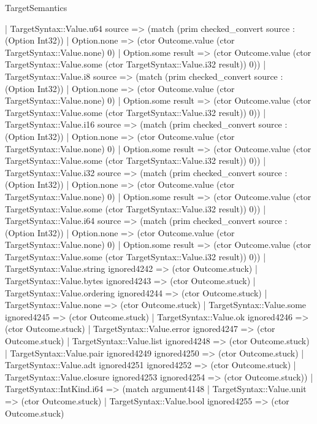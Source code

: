 \begin{lexlean}{TargetSemantics}
\begin{semanticmodule}
{            | TargetSyntax::Value.u64 source => (match (prim checked_convert source : (Option Int32))
              | Option.none => (ctor Outcome.value (ctor TargetSyntax::Value.none) 0)
              | Option.some result => (ctor Outcome.value (ctor TargetSyntax::Value.some (ctor TargetSyntax::Value.i32 result)) 0))
            | TargetSyntax::Value.i8 source => (match (prim checked_convert source : (Option Int32))
              | Option.none => (ctor Outcome.value (ctor TargetSyntax::Value.none) 0)
              | Option.some result => (ctor Outcome.value (ctor TargetSyntax::Value.some (ctor TargetSyntax::Value.i32 result)) 0))
            | TargetSyntax::Value.i16 source => (match (prim checked_convert source : (Option Int32))
              | Option.none => (ctor Outcome.value (ctor TargetSyntax::Value.none) 0)
              | Option.some result => (ctor Outcome.value (ctor TargetSyntax::Value.some (ctor TargetSyntax::Value.i32 result)) 0))
            | TargetSyntax::Value.i32 source => (match (prim checked_convert source : (Option Int32))
              | Option.none => (ctor Outcome.value (ctor TargetSyntax::Value.none) 0)
              | Option.some result => (ctor Outcome.value (ctor TargetSyntax::Value.some (ctor TargetSyntax::Value.i32 result)) 0))
            | TargetSyntax::Value.i64 source => (match (prim checked_convert source : (Option Int32))
              | Option.none => (ctor Outcome.value (ctor TargetSyntax::Value.none) 0)
              | Option.some result => (ctor Outcome.value (ctor TargetSyntax::Value.some (ctor TargetSyntax::Value.i32 result)) 0))
            | TargetSyntax::Value.string ignored4242 => (ctor Outcome.stuck)
            | TargetSyntax::Value.bytes ignored4243 => (ctor Outcome.stuck)
            | TargetSyntax::Value.ordering ignored4244 => (ctor Outcome.stuck)
            | TargetSyntax::Value.none => (ctor Outcome.stuck)
            | TargetSyntax::Value.some ignored4245 => (ctor Outcome.stuck)
            | TargetSyntax::Value.ok ignored4246 => (ctor Outcome.stuck)
            | TargetSyntax::Value.error ignored4247 => (ctor Outcome.stuck)
            | TargetSyntax::Value.list ignored4248 => (ctor Outcome.stuck)
            | TargetSyntax::Value.pair ignored4249 ignored4250 => (ctor Outcome.stuck)
            | TargetSyntax::Value.adt ignored4251 ignored4252 => (ctor Outcome.stuck)
            | TargetSyntax::Value.closure ignored4253 ignored4254 => (ctor Outcome.stuck))
          | TargetSyntax::IntKind.i64 => (match argument4148
            | TargetSyntax::Value.unit => (ctor Outcome.stuck)
            | TargetSyntax::Value.bool ignored4255 => (ctor Outcome.stuck)
}
\end{semanticmodule}
\end{lexlean}
